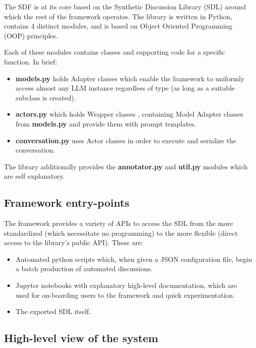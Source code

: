 The SDF is at its core based on the Synthetic Discussion Library (SDL) around which the rest of the framework operates. The library is written in Python, contains 4 distinct modules, and is based on Object Oriented Programming (OOP) principles.

Each of these modules contains classes and supporting code for a specific function. In brief:

\begin{itemize}
	\item \textbf{models.py} holds Adapter classes \cite{gamma1995design} which enable the framework to uniformly access almost any LLM instance regardless of type (as long as a suitable subclass is created).
	
	\item \textbf{actors.py} which holds Wrapper classes \cite{gamma1995design}, containing Model Adapter classes from \textbf{models.py} and provide them with prompt templates.
	
	\item \textbf{conversation.py} uses Actor classes in order to execute and serialize the conversation.
\end{itemize}

The library additionally provides the \textbf{annotator.py} and \textbf{util.py} modules which are self explanatory.


\subsection{Framework entry-points}
\label{ssec:system:entrypoints}

The framework provides a variety of APIs to access the SDL from the more standardized (which necessitate no programming) to the more flexible (direct access to the library's public API). These are:

\begin{itemize}
	\item Automated python scripts which, when given a JSON configuration file, begin a batch production of automated discussions.
	
	\item Jupyter notebooks with explanatory high-level documentation, which are used for on-boarding users to the framework and quick experimentation.
	
	\item The exported SDL itself.
\end{itemize}


\subsection{High-level view of the system}
\label{ssec:system:overview}

